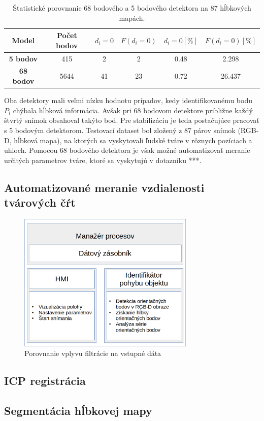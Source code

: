 \begin{table}[h]
	\caption{\label{tab:dlib:compare} Štatistické porovnanie 68 bodového a 5 bodového detektora na 87 hĺbkových mapách.}
	\centering
	\begin{tabular}{cccccc}
		\toprule
		\textbf{Model} & \textbf{Počet bodov} & \textbf{$d_i=0$} & \textbf{$F(d_i=0)$} & \textbf{$d_i=0 [\%]$ } & \textbf{$F(d_i=0) [\%]$} \\ 
		\midrule
		\textbf{5 bodov} 	& 415 	& 2		& 2		& 0.48	& 2.298 \\
		\textbf{68 bodov} 	& 5644	& 41 	& 23	& 0.72	& 26.437 \\
		\bottomrule
	\end{tabular}
\end{table}

Oba detektory mali veľmi nízku hodnotu prípadov, kedy identifikovanému bodu $P_i$ chýbala hĺbková informácia.  Avšak pri 68 bodovom detektore približne každý štvrtý snímok obsahoval takýto bod. Pre stabilizáciu je teda postačujúce pracovať s 5 bodovým detektorom. Testovací dataset bol zložený z 87 párov snímok (RGB-D, hĺbková mapa), na ktorých sa vyskytovali ľudské tváre v rôznych pozíciach a uhloch. Pomocou 68 bodového detektora je však možné automatizovať meranie určitých parametrov tváre, ktoré sa vyskytujú v dotazníku ***. 


\subsection{Automatizované meranie vzdialenosti tvárových čŕt}




\begin{figure}[H]
	\centering
	\includegraphics[width=0.75\textwidth]{figures/algorithm_faceland.png}
	\caption{Porovnanie vplyvu filtrácie na vstupné dáta}
	\label{fig:algorithm:result:a}
	\label{fig:algorithm:result:b}
	\label{fig:algorithm:result:c}
\end{figure}

\subsection{ICP registrácia}

\subsection{Segmentácia hĺbkovej mapy}
